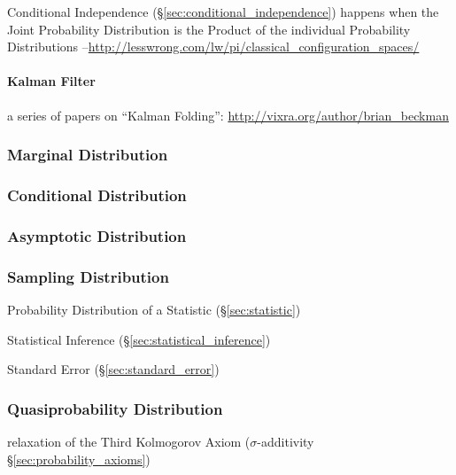 Conditional Independence (\S\ref{sec:conditional_independence}) happens when
the Joint Probability Distribution is the Product of the individual Probability
Distributions
--\url{http://lesswrong.com/lw/pi/classical_configuration_spaces/}



\paragraph{Kalman Filter}\label{sec:kalman_filter}\hfill

a series of papers on ``Kalman Folding'':
\url{http://vixra.org/author/brian_beckman}



\subsubsection{Marginal Distribution}\label{sec:marginal_distribution}

\subsubsection{Conditional Distribution}
\label{sec:conditional_distribution}

\subsubsection{Asymptotic Distribution}
\label{sec:asymptotic_distribution}

\subsubsection{Sampling Distribution}\label{sec:sampling_distribution}

Probability Distribution of a Statistic (\S\ref{sec:statistic})

Statistical Inference (\S\ref{sec:statistical_inference})

Standard Error (\S\ref{sec:standard_error})



\subsubsection{Quasiprobability Distribution}
\label{sec:quasiprobability_distribution}

relaxation of the Third Kolmogorov Axiom ($\sigma$-additivity
\S\ref{sec:probability_axioms})

